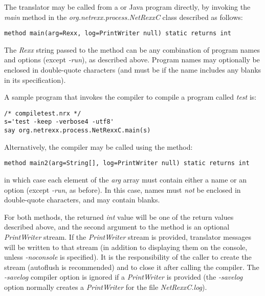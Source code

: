 {The translator may be called from a \nr{}or Java program directly, by
invoking the \emph{main} method in the \emph{org.netrexx.process.NetRexxC}
class described as follows:

\begin{lstlisting}[label=ivmain,caption=Invoking NetRexxC.main]
method main(arg=Rexx, log=PrintWriter null) static returns int
\end{lstlisting}

The \emph{Rexx} string passed to the method can be any combination of
program names and options (except \emph{-run}), as described above.
Program names may optionally be enclosed in double-quote characters (and
must be if the name includes any blanks in its specification).

A sample \nr{}program that invokes the \nr{}compiler to compile a
program called \emph{test} is:
\begin{lstlisting}[label=compiletest,caption=Compiletest]
/* compiletest.nrx */
s='test -keep -verbose4 -utf8'
say org.netrexx.process.NetRexxC.main(s)
\end{lstlisting}

Alternatively, the compiler may be called using the method:
\begin{lstlisting}[label=array,caption=Calling with Array argument]
method main2(arg=String[], log=PrintWriter null) static returns int
\end{lstlisting}
in which case each element of the \emph{arg} array must contain
either a name or an option (except \emph{-run}, as before).  In this
case, names must \emph{not} be enclosed in double-quote characters, and
may contain blanks.

For both methods, the returned \emph{int} value will be one of the
return values described above, and the second argument to the method is
an optional \emph{PrintWriter} stream.  If the \emph{PrintWriter} stream
is provided, translator messages will be written to that stream (in
addition to displaying them on the console, unless \emph{-noconsole} is
specified).
It is the responsibility of the caller to create the stream (autoflush
is recommended) and to close it after calling the compiler.
The \emph{-savelog} compiler option is ignored if a \emph{PrintWriter}
is provided (the \emph{-savelog} option normally creates
a \emph{PrintWriter} for the file \emph{NetRexxC.log}).

}
